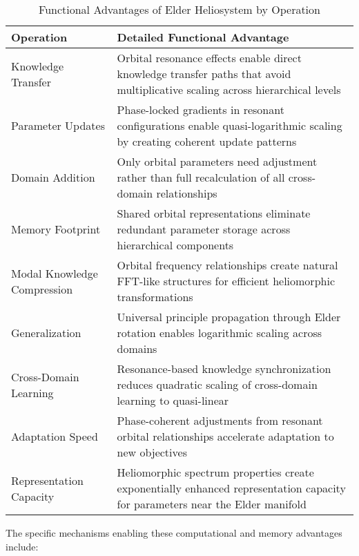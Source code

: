 \begin{table}[p]
\centering
\small
\caption{Functional Advantages of Elder Heliosystem by Operation}
\label{tab:functional_advantages}
\begin{tabular}{|p{3cm}|p{9cm}|}
\hline
\textbf{Operation} & \textbf{Detailed Functional Advantage} \\
\hline
Knowledge Transfer & Orbital resonance effects enable direct knowledge transfer paths that avoid multiplicative scaling across hierarchical levels \\
\hline
Parameter Updates & Phase-locked gradients in resonant configurations enable quasi-logarithmic scaling by creating coherent update patterns \\
\hline
Domain Addition & Only orbital parameters need adjustment rather than full recalculation of all cross-domain relationships \\
\hline
Memory Footprint & Shared orbital representations eliminate redundant parameter storage across hierarchical components \\
\hline
Modal Knowledge Compression & Orbital frequency relationships create natural FFT-like structures for efficient heliomorphic transformations \\
\hline
Generalization & Universal principle propagation through Elder rotation enables logarithmic scaling across domains \\
\hline
Cross-Domain Learning & Resonance-based knowledge synchronization reduces quadratic scaling of cross-domain learning to quasi-linear \\
\hline
Adaptation Speed & Phase-coherent adjustments from resonant orbital relationships accelerate adaptation to new objectives \\
\hline
Representation Capacity & Heliomorphic spectrum properties create exponentially enhanced representation capacity for parameters near the Elder manifold \\
\hline
\end{tabular}
\end{table}

The specific mechanisms enabling these computational and memory advantages include:

